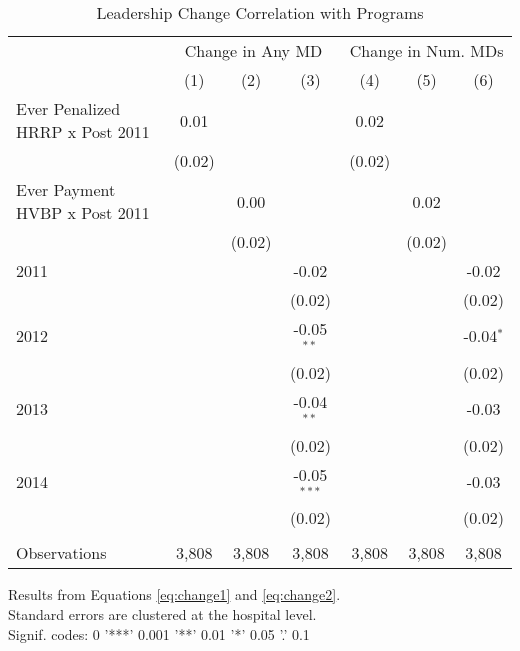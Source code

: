\begin{table}[htbp]
   \caption{\label{tab:change_analysis} Leadership Change Correlation with Programs}
   \bigskip
   \centering
   \begin{tabular}{lcccccc}
      \toprule
       & \multicolumn{3}{c}{Change in Any MD} & \multicolumn{3}{c}{Change in Num. MDs}\\
                                      & (1)    & (2)    & (3)           & (4)    & (5)    & (6)\\  
      \midrule 
      Ever Penalized HRRP x Post 2011 & 0.01   &        &               & 0.02   &        &   \\   
                                      & (0.02) &        &               & (0.02) &        &   \\   
      Ever Payment HVBP x Post 2011   &        & 0.00   &               &        & 0.02   &   \\   
                                      &        & (0.02) &               &        & (0.02) &   \\   
      2011                            &        &        & -0.02         &        &        & -0.02\\   
                                      &        &        & (0.02)        &        &        & (0.02)\\   
      2012                            &        &        & -0.05$^{**}$  &        &        & -0.04$^{*}$\\   
                                      &        &        & (0.02)        &        &        & (0.02)\\   
      2013                            &        &        & -0.04$^{**}$  &        &        & -0.03\\   
                                      &        &        & (0.02)        &        &        & (0.02)\\   
      2014                            &        &        & -0.05$^{***}$ &        &        & -0.03\\   
                                      &        &        & (0.02)        &        &        & (0.02)\\   
       \\
      Observations                    & 3,808  & 3,808  & 3,808         & 3,808  & 3,808  & 3,808\\  
      \bottomrule
   \end{tabular}
   
   \par \raggedright 
   Results from Equations \ref{eq:change1} and \ref{eq:change2}.\\
   Standard errors are clustered at the hospital level.\\
   Signif. codes: 0 '***' 0.001 '**' 0.01 '*' 0.05 '.' 0.1
\end{table}
